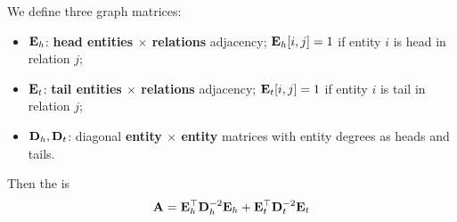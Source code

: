 \begin{definition}\label{def:lec15-relgraph}
  We define three graph matrices:
  \begin{itemize}
    \item $\mathbf{E}_h$: \textbf{head entities $\times$ relations} adjacency; $\mathbf{E}_h[i,j]=1$ if
      entity $i$ is head in relation $j$;
    \item $\mathbf{E}_t$: \textbf{tail entities $\times$ relations} adjacency; $\mathbf{E}_t[i,j]=1$ if
      entity $i$ is tail in relation $j$;
    \item $\mathbf{D}_h,\mathbf{D}_t$: diagonal \textbf{entity $\times$ entity} matrices with entity
      degrees as heads and tails.
  \end{itemize}
  Then the  is
  \begin{equation}\label{eq:lec15-A}
    \mathbf{A} = \mathbf{E}_h^{\top}\mathbf{D}_h^{-2}\mathbf{E}_h + \mathbf{E}_t^{\top}\mathbf{D}_t^{-2}\mathbf{E}_t
  \end{equation}
\end{definition}

